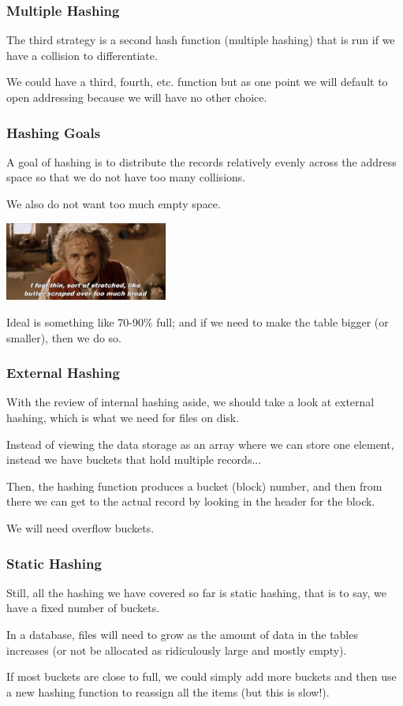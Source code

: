 \begin{frame}
\frametitle{Multiple Hashing}

The third strategy is a second hash function (\alert{multiple hashing}) that is run if we have a collision to differentiate. 

We could have a third, fourth, etc. function but as one point we will default to open addressing because we will have no other choice.


\end{frame}



\begin{frame}
\frametitle{Hashing Goals}

A goal of hashing is to distribute the records relatively evenly across the address space so that we do not have too many collisions.

We also do not want too much empty space. 

\begin{center}
	\includegraphics[width=0.4\textwidth]{images/butter.jpg}
\end{center}

Ideal is something like 70-90\% full; and if we need to make the table bigger (or smaller), then we do so.

\end{frame}

\begin{frame}
\frametitle{External Hashing}

With the review of internal hashing aside, we should take a look at external hashing, which is what we need for files on disk. 

Instead of viewing the data storage as an array where we can store one element, instead we have buckets that hold multiple records... 

Then, the hashing function produces a bucket (block) number, and then from there we can get to the actual record by looking in the header for the block.

We will need overflow buckets.

\end{frame}

\begin{frame}
\frametitle{Static Hashing}
Still, all the hashing we have covered so far is \alert{static hashing}, that is to say, we have a fixed number of buckets. 

In a database, files will need to grow as the amount of data in the tables increases (or not be allocated as ridiculously large and mostly empty). 

If most buckets are close to full, we could simply add more buckets and then use a new hashing function to reassign all the items (but this is slow!).

\end{frame}


